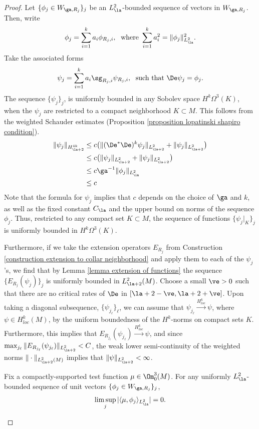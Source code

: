 \documentclass[hidelinks, 12pt, oneside, reqno]{amsart}
\begin{document}
\begin{proof}
    Let $\{\phi_j \in W_{\ga, R_j} \}_j$ be an $L^2_{\la}$-bounded sequence of vectors in $W_{\ga, R_j}$. Then, write
    \[\phi_j = \sum_{i=1}^k a_i \phi_{R_j, i}, \; \text{ where }\sum_{i=1}^k a_i^2 = \|\phi_j\|_{L^2_{\la}}^2.\]
    Take the associated forms
    \[\psi_j = \sum_{i=1}^k a_i \sg_{R_j,i}\psi_{R_j, i}, \; \text{ such that }\De \psi_j = \phi_j.\]
    The sequence $\{\psi_j\}_j$, is uniformly bounded in any Sobolev space $H^k\Omega^3(K)$, when the $\psi_j$ are restricted to a compact neighborhood $K \subset M$. This follows from the weighted Schauder estimates (Proposition \ref{proposition lopatinski shapiro condition}).
    \begin{align*}
        \|\psi_j\|_{H^{4k}_{\la+2}} &\le c\big(\|(\De^*\De)^k \psi_j\|_{L^2_{\la+2}} + \|\psi_j\|_{L^2_{\la+2}}\big) \\
        &\le c\big(\|\psi_j\|_{L^2_{\la+2}} + \|\psi_j\|_{L^2_{\la+2}}\big) \\
        &\le c \ga^{-1} \|\phi_j\|_{L^2_\la}\\
        &\le c
    \end{align*}
    Note that the formula for $\psi_j$ implies that $c$ depends on the choice of $\ga$ and $k$, as well as the fixed constant $C_\la$ and the upper bound on norms of the sequence $\phi_j$. Thus, restricted to any compact set $K \subset M$, the sequence of functions $\{\psi_j|_K\}_j$ is uniformly bounded in $H^k\Omega^3(K)$. 

    Furthermore, if we take the extension operators $E_{R_j}$ from Construction \ref{construction extension to collar neighborhood} and apply them to each of the $\psi_j$'s, we find that by Lemma \ref{lemma extension of functions} the sequence $\{E_{R_j}(\psi_j)\}_j$ is uniformly bounded in $L^2_{\la+2}(M)$. Choose a small $\ve > 0$ such that there are no critical rates of $\De$ in $[\la+2-\ve, \la+2+\ve]$. Upon taking a diagonal subsequence, $\{\psi_{j_\ell}\}_\ell$, we can assume that $\psi_{j_\ell} \xrightarrow{H^k_{loc}} \psi$, where $\psi \in H^k_{loc}(M)$, by the uniform boundedness of the $H^k$-norms on compact sets $K$. Furthermore, this implies that $E_{R_{j_\ell}}(\psi_{j_\ell}) \xrightarrow{H^k_{loc}} \psi$, and since $\max_{j_\ell} \|E_{R_{j_\ell}}(\psi_{j_\ell})\|_{L^2_{\la +2}} < C$, the weak lower semi-continuity of the weighted norms $\| \cdot \|_{L^2_{\la+2}(M)}$ implies that $\|\psi\|_{L^2_{\la + 2}} < \infty$.

    
    \begin{clm}\label{claim compact vanishing}
    Fix a compactly-supported test function $\mu \in \Om^3_0(M)$. For any uniformly $L^2_\la$-bounded sequence of unit vectors $\{\phi_j \in W_{\ga, R_j} \}_j$,
    \[
    \limsup_j |\langle \mu, \phi_j \rangle_{L^2_\la}| = 0.
    \]
    \end{clm}


\end{proof}
\end{document}
